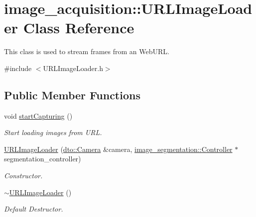 \hypertarget{classimage__acquisition_1_1_u_r_l_image_loader}{}\section{image\+\_\+acquisition\+:\+:U\+R\+L\+Image\+Loader Class Reference}
\label{classimage__acquisition_1_1_u_r_l_image_loader}


This class is used to stream frames from an Web\+U\+RL.  




{\ttfamily \#include $<$U\+R\+L\+Image\+Loader.\+h$>$}

\subsection*{Public Member Functions}
\begin{DoxyCompactItemize}
\item 
\mbox{\label{classimage__acquisition_1_1_u_r_l_image_loader_a6a1b4f8c7adde9d6c0afbc9bdf85506f}} 
void \mbox{\hyperlink{classimage__acquisition_1_1_u_r_l_image_loader_a6a1b4f8c7adde9d6c0afbc9bdf85506f}{start\+Capturing}} ()
\begin{DoxyCompactList}\small\item\em Start loading images from U\+RL. \end{DoxyCompactList}\item 
\mbox{\label{classimage__acquisition_1_1_u_r_l_image_loader_a6b775920bb06954e28c5b11263c37193}} 
\mbox{\hyperlink{classimage__acquisition_1_1_u_r_l_image_loader_a6b775920bb06954e28c5b11263c37193}{U\+R\+L\+Image\+Loader}} (\mbox{\hyperlink{structdto_1_1_camera}{dto\+::\+Camera}} \&camera, \mbox{\hyperlink{classimage__segmentation_1_1_controller}{image\+\_\+segmentation\+::\+Controller}} $\ast$segmentation\+\_\+controller)
\begin{DoxyCompactList}\small\item\em Constructor. \end{DoxyCompactList}\item 
\mbox{\label{classimage__acquisition_1_1_u_r_l_image_loader_a5e67b1448bc3a44389d46e958658b7d5}} 
\mbox{\hyperlink{classimage__acquisition_1_1_u_r_l_image_loader_a5e67b1448bc3a44389d46e958658b7d5}{$\sim$\+U\+R\+L\+Image\+Loader}} ()
\begin{DoxyCompactList}\small\item\em Default Destructor. \end{DoxyCompactList}\end{DoxyCompactItemize}
